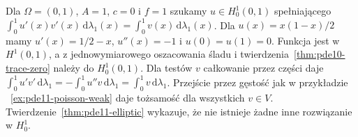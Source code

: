 \begin{przyklad}
\label{ex:pde11-1d}
Dla $\Omega=(0,1)$, $A=1$, $c=0$ i $f=1$
szukamy $u\in H_0^1(0,1)$ spełniającego
$\int_0^1u'(x)v'(x)\,\mathrm d\lambda_1(x)
=\int_0^1v(x)\,\mathrm d\lambda_1(x)$.
Dla $u(x)=x(1-x)/2$ mamy $u'(x)=1/2-x$,
$u''(x)=-1$ i $u(0)=u(1)=0$.
Funkcja jest w $H^1(0,1)$, a z jednowymiarowego
oszacowania śladu i twierdzenia~\ref{thm:pde10-trace-zero}
należy do $H_0^1(0,1)$.
Dla testów $v$ całkowanie przez części daje
$\int_0^1 u'v'\,\mathrm d\lambda_1
=-\int_0^1 u''v\,\mathrm d\lambda_1
=\int_0^1 v\,\mathrm d\lambda_1$.
Przejście przez gęstość jak w przykładzie
~\ref{ex:pde11-poisson-weak} daje tożsamość dla wszystkich $v\in V$. Twierdzenie~\ref{thm:pde11-elliptic}
wykazuje, że nie istnieje żadne inne rozwiązanie w $H_0^1$.
\end{przyklad}


